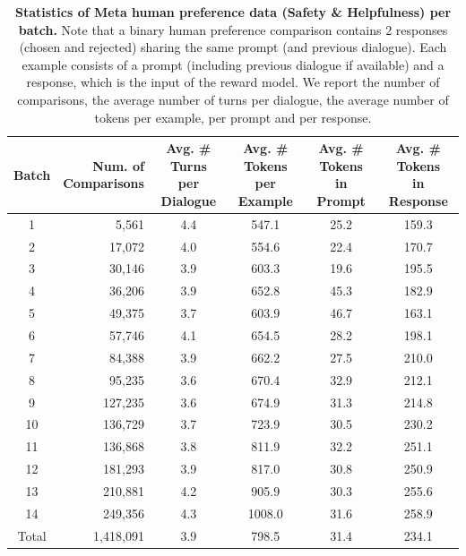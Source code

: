 \begin{table}[t!]
  \centering
  \setlength{\tabcolsep}{4pt}
   {
  \begin{tabular}{crcccc@{}}
    \toprule
    Batch & \shortstack[r]{Num. of \\ Comparisons} & \shortstack{ Avg. \# Turns \\ per Dialogue}  & \shortstack{Avg. \# Tokens \\ per Example} & \shortstack{Avg. \# Tokens \\in Prompt} & \shortstack{Avg. \# Tokens \\ in Response} \\
    \midrule
     1  & 5,561  & 4.4 & 547.1 & 25.2 & 159.3 \\
     2  & 17,072  & 4.0 & 554.6 & 22.4 & 170.7 \\
     3  & 30,146  & 3.9 & 603.3 & 19.6 & 195.5 \\
     4  & 36,206  & 3.9 & 652.8 & 45.3 & 182.9 \\
     5  & 49,375  & 3.7 & 603.9 & 46.7 & 163.1 \\
     6  & 57,746  & 4.1 & 654.5 & 28.2 & 198.1 \\
     7  & 84,388  & 3.9 & 662.2 & 27.5 & 210.0 \\
     8  & 95,235  & 3.6 & 670.4 & 32.9 & 212.1 \\
     9  & 127,235  & 3.6 & 674.9 & 31.3 & 214.8 \\
     10  & 136,729  & 3.7 & 723.9 & 30.5 & 230.2 \\
     11  & 136,868  & 3.8 & 811.9 & 32.2 & 251.1 \\
     12  & 181,293  & 3.9 & 817.0 & 30.8 & 250.9 \\
     13  & 210,881  & 4.2 & 905.9 & 30.3 & 255.6 \\
     14  & 249,356  & 4.3 & 1008.0 & 31.6 & 258.9 \\
    \midrule
    Total & 1,418,091 & 3.9 & 798.5 & 31.4 & 234.1 \\
    \bottomrule
  \end{tabular}}
  \vspace{0.3cm}
  \caption{\textbf{Statistics of Meta human preference data (Safety \& Helpfulness) per batch.} Note that a binary human preference comparison contains 2 responses (chosen and rejected) sharing the same prompt (and previous dialogue). Each example consists of a prompt (including previous dialogue if available) and a response, which is the input of the reward model. We report the number of comparisons, the average number of turns per dialogue, the average number of tokens per example, per prompt and per response.
  \label{tab:meta_human_pref_data}}
\end{table}

